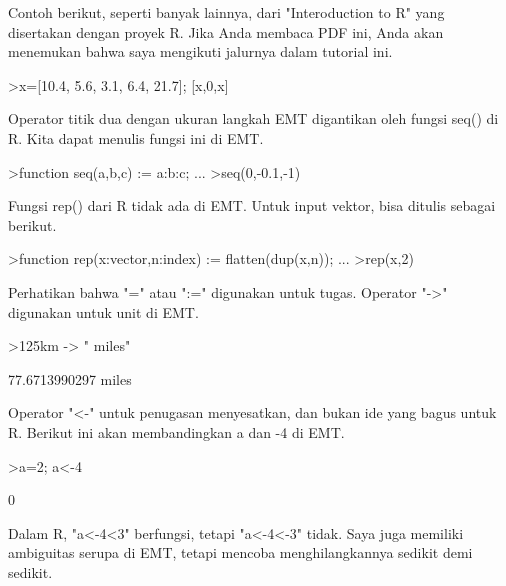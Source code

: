 \documentclass[a4paper,10pt]{article}
\begin{document}
\begin{eulernotebook}
\begin{eulercomment}
\begin{eulercomment}
\begin{eulercomment}
\begin{eulercomment}
\begin{eulercomment}
Contoh berikut, seperti banyak lainnya, dari "Interoduction to R" yang
disertakan dengan proyek R. Jika Anda membaca PDF ini, Anda akan
menemukan bahwa saya mengikuti jalurnya dalam tutorial ini.
\end{eulercomment}
\begin{eulerprompt}
>x=[10.4, 5.6, 3.1, 6.4, 21.7]; [x,0,x]
\end{eulerprompt}
\begin{euleroutput}
  [10.4,  5.6,  3.1,  6.4,  21.7,  0,  10.4,  5.6,  3.1,  6.4,  21.7]
\end{euleroutput}
\begin{eulercomment}
Operator titik dua dengan ukuran langkah EMT digantikan oleh fungsi
seq() di R. Kita dapat menulis fungsi ini di EMT.
\end{eulercomment}
\begin{eulerprompt}
>function seq(a,b,c) := a:b:c; ...
>seq(0,-0.1,-1)
\end{eulerprompt}
\begin{euleroutput}
  [0,  -0.1,  -0.2,  -0.3,  -0.4,  -0.5,  -0.6,  -0.7,  -0.8,  -0.9,  -1]
\end{euleroutput}
\begin{eulercomment}
Fungsi rep() dari R tidak ada di EMT. Untuk input vektor, bisa ditulis
sebagai berikut.
\end{eulercomment}
\begin{eulerprompt}
>function rep(x:vector,n:index) := flatten(dup(x,n)); ...
>rep(x,2)
\end{eulerprompt}
\begin{euleroutput}
  [10.4,  5.6,  3.1,  6.4,  21.7,  10.4,  5.6,  3.1,  6.4,  21.7]
\end{euleroutput}
\begin{eulercomment}
Perhatikan bahwa "=" atau ":=" digunakan untuk tugas. Operator "-\textgreater{}"
digunakan untuk unit di EMT.
\end{eulercomment}
\begin{eulerprompt}
>125km -> " miles"
\end{eulerprompt}
\begin{euleroutput}
  77.6713990297 miles
\end{euleroutput}
\begin{eulercomment}
Operator "\textless{}-" untuk penugasan menyesatkan, dan bukan ide yang bagus
untuk R. Berikut ini akan membandingkan a dan -4 di EMT.
\end{eulercomment}
\begin{eulerprompt}
>a=2; a<-4
\end{eulerprompt}
\begin{euleroutput}
  0
\end{euleroutput}
\begin{eulercomment}
Dalam R, "a\textless{}-4\textless{}3" berfungsi, tetapi "a\textless{}-4\textless{}-3" tidak. Saya juga
memiliki ambiguitas serupa di EMT, tetapi mencoba menghilangkannya
sedikit demi sedikit.


\end{eulercomment}
\end{eulercomment}
\end{eulercomment}
\end{eulercomment}
\end{eulercomment}
\end{eulernotebook}
\end{document}
